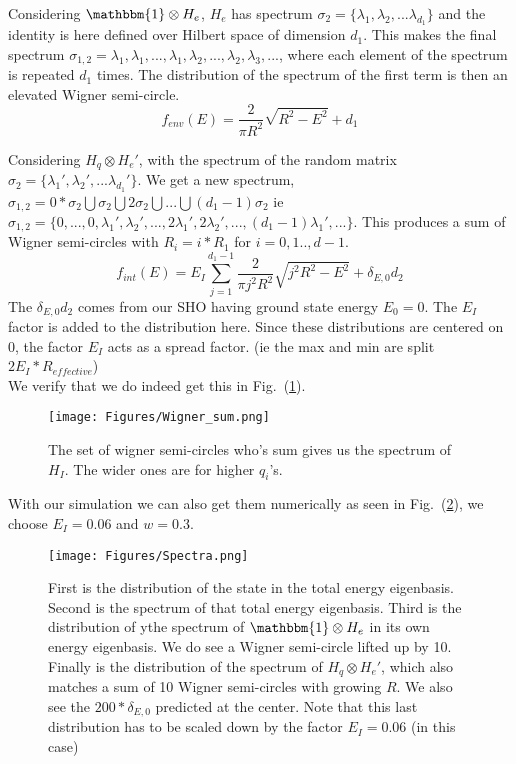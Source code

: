 \documentclass{article}
\begin{document}
Considering $\mathbbm{1}\otimes H_{e}$, $H_{e}$ has spectrum $\sigma_2=\{\lambda_1,\lambda_2,...\lambda_{d_1}\}$ and the identity is here defined over Hilbert space of dimension $d_1$. This makes  the final spectrum $\sigma_{1,2}={\lambda_1, \lambda_1, ..., \lambda_1, \lambda_2, ...,\lambda_2, \lambda_3, ...}$, where each element of the spectrum is repeated $d_1$ times. The distribution of the spectrum of the first term is then an elevated Wigner semi-circle.
\begin{equation}
    f_{env}(E) = \frac{2}{\pi R^2}\sqrt{R^2-E^2} + d_1
\end{equation}

Considering $H_q\otimes H_{e}'$, with the spectrum of the random matrix $\sigma_2=\{\lambda_1',\lambda_2',...\lambda_{d_1}'\}$. We get a new spectrum,  $\sigma_{1,2}=0*\sigma_2\bigcup\sigma_2\bigcup2\sigma_2\bigcup ...\bigcup(d_1-1)\sigma_2$ ie $\sigma_{1,2}= \{0,...,0,\lambda_1', \lambda_2', ..., 2\lambda_1', 2\lambda_2',..., (d_1-1)\lambda_1',...\}$. This produces a sum of Wigner semi-circles with $R_i=i*R_1$ for $i=0,1..,d-1$.
\begin{equation}
    f_{int}(E) = E_I\sum_{j=1}^{d_1-1}\frac{2}{\pi j^2R^2}\sqrt{j^2R^2-E^2} + \delta_{E,0}d_2
\end{equation}
The $\delta_{E,0}d_2$ comes from our SHO having ground state energy $E_0=0$. The $E_I$ factor is added to the distribution here. Since these distributions are centered on 0, the factor $E_I$ acts as a spread factor. (ie the max and min are split $2E_I*R_{effective}$)\\

We verify that we do indeed get this in Fig.~(\ref{fig:wigner_sum}). 

\begin{figure}[h]
    \centering
    \texttt{[image: Figures/Wigner\_sum.png]}
    \caption{The set of wigner semi-circles who's sum gives us the spectrum of $H_I$. The wider ones are for higher $q_i$'s.}
    \label{fig:wigner_sum}
\end{figure}

With our simulation we can also get them numerically as seen in Fig.~(\ref{fig:spectra}), we choose $E_I=0.06$ and $w=0.3$.
\begin{figure}
    \centering
    \texttt{[image: Figures/Spectra.png]}
    \caption{First is the distribution of the state in the total energy eigenbasis. Second is the spectrum of that total energy eigenbasis. Third is the distribution of ythe spectrum of $\mathbbm{1}\otimes H_e$ in its own energy eigenbasis. We do see a Wigner semi-circle lifted up by 10. Finally is the distribution of the spectrum of $H_q\otimes H_e'$, which also matches a sum of 10 Wigner semi-circles with growing $R$. We also see the $200*\delta_{E,0}$ predicted at the center. Note that this last distribution has to be scaled down by the factor $E_I=0.06$ (in this case)}
    \label{fig:spectra}
\end{figure}
\end{document}

